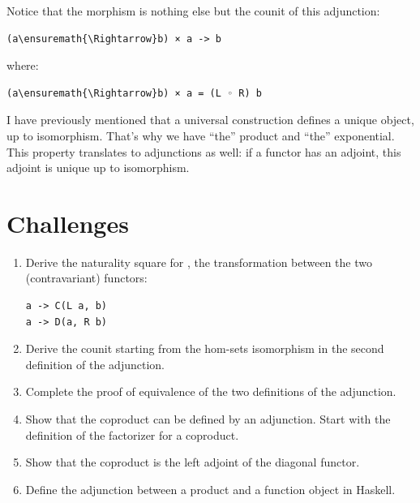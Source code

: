 \noindent
Notice that the  morphism is nothing else but the counit of
this adjunction:

\begin{Verbatim}[commandchars=\\\{\}]
(a\ensuremath{\Rightarrow}b) × a -> b
\end{Verbatim}
where:

\begin{Verbatim}[commandchars=\\\{\}]
(a\ensuremath{\Rightarrow}b) × a = (L ◦ R) b
\end{Verbatim}
I have previously mentioned that a universal construction defines a
unique object, up to isomorphism. That's why we have ``the'' product and
``the'' exponential. This property translates to adjunctions as well: if
a functor has an adjoint, this adjoint is unique up to isomorphism.

\section{Challenges}\label{challenges}

\begin{enumerate}
\tightlist
\item
  Derive the naturality square for , the transformation
  between the two (contravariant) functors:

\begin{verbatim}
a -> C(L a, b)
a -> D(a, R b)
\end{verbatim}
\item
  Derive the counit  starting from the hom-sets isomorphism in
  the second definition of the adjunction.
\item
  Complete the proof of equivalence of the two definitions of the
  adjunction.
\item
  Show that the coproduct can be defined by an adjunction. Start with
  the definition of the factorizer for a coproduct.
\item
  Show that the coproduct is the left adjoint of the diagonal functor.
\item
  Define the adjunction between a product and a function object in
  Haskell.
\end{enumerate}